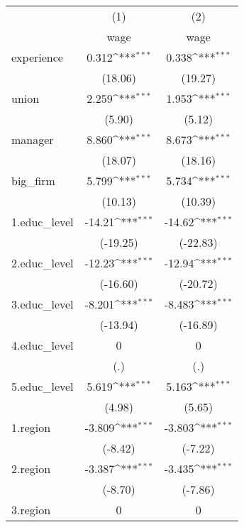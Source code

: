 {
\def\sym#1{\ifmmode^{#1}\else\(^{#1}\)\fi}
\begin{tabular}{l*{2}{c}}
\hline\hline
            &\multicolumn{1}{c}{(1)}&\multicolumn{1}{c}{(2)}\\
            &\multicolumn{1}{c}{wage}&\multicolumn{1}{c}{wage}\\
\hline
experience  &       0.312\sym{***}&       0.338\sym{***}\\
            &     (18.06)         &     (19.27)         \\
[1em]
union       &       2.259\sym{***}&       1.953\sym{***}\\
            &      (5.90)         &      (5.12)         \\
[1em]
manager     &       8.860\sym{***}&       8.673\sym{***}\\
            &     (18.07)         &     (18.16)         \\
[1em]
big\_firm    &       5.799\sym{***}&       5.734\sym{***}\\
            &     (10.13)         &     (10.39)         \\
[1em]
1.educ\_level&      -14.21\sym{***}&      -14.62\sym{***}\\
            &    (-19.25)         &    (-22.83)         \\
[1em]
2.educ\_level&      -12.23\sym{***}&      -12.94\sym{***}\\
            &    (-16.60)         &    (-20.72)         \\
[1em]
3.educ\_level&      -8.201\sym{***}&      -8.483\sym{***}\\
            &    (-13.94)         &    (-16.89)         \\
[1em]
4.educ\_level&           0         &           0         \\
            &         (.)         &         (.)         \\
[1em]
5.educ\_level&       5.619\sym{***}&       5.163\sym{***}\\
            &      (4.98)         &      (5.65)         \\
[1em]
1.region    &      -3.809\sym{***}&      -3.803\sym{***}\\
            &     (-8.42)         &     (-7.22)         \\
[1em]
2.region    &      -3.387\sym{***}&      -3.435\sym{***}\\
            &     (-8.70)         &     (-7.86)         \\
[1em]
3.region    &           0         &           0         \\

\end{tabular}}
